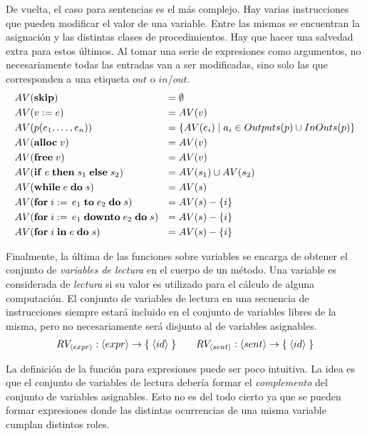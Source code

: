 \documentclass{article}
\begin{document}

De vuelta, el caso para sentencias es el más complejo.
Hay varias instrucciones que pueden modificar el valor de una variable.
Entre las mismas se encuentran la asignación y las distintas clases de procedimientos.
Hay que hacer una salvedad extra para estos últimos.
Al tomar una serie de expresiones como argumentos, no necesariamente todas las entradas van a ser modificadas, sino solo las que corresponden a una etiqueta $out$ o $in/out$.
\begin{align*}
&AV(\mathbf{skip})
&=&\;
\emptyset
\\
&AV(v := e)
&=&\;
AV(v)
\\
&AV(p(e_1, \ldots, e_n))
&=&\;
\{ AV(e_i) \mid a_i \in Outputs(p) \cup InOuts(p) \}
\\
&AV(\mathbf{alloc} \; v)
&=&\;
AV(v)
\\
&AV(\mathbf{free} \; v)
&=&\;
AV(v)
\\
&AV(\mathbf{if} \; e \; \mathbf{then} \; s_1 \; \mathbf{else} \; s_2)
&=&\;
AV(s_1) \cup AV(s_2)
\\
&AV(\mathbf{while} \; e \; \mathbf{do} \; s)
&=&\;
AV(s)
\\
&AV(\mathbf{for} \; i := \, e_1 \; \mathbf{to} \; e_2 \; \mathbf{do} \; s)
&=&\;
AV(s) - \{ i \}
\\
&AV(\mathbf{for} \; i := \, e_1 \; \mathbf{downto} \; e_2 \; \mathbf{do} \; s)
&=&\;
AV(s) - \{ i \}
\\
&AV(\mathbf{for} \; i \; \mathbf{in} \; e \; \mathbf{do} \; s)
&=&\;
AV(s) - \{ i \}
\end{align*}

Finalmente, la última de las funciones sobre variables se encarga de obtener el conjunto de \textit{variables de lectura} en el cuerpo de un método.
Una variable es considerada de \textit{lectura} si su valor es utilizado para el cálculo de alguna computación.
El conjunto de variables de lectura en una secuencia de instrucciones siempre estará incluido en el conjunto de variables libres de la misma, pero no necesariamente será disjunto al de variables asignables.
\begin{gather*}
RV_{\langle expr \rangle}: \langle expr \rangle \rightarrow \{ \; \langle id \rangle \; \}
\qquad
RV_{\langle sent \rangle}: \langle sent \rangle \rightarrow \{ \; \langle id \rangle \; \}
\end{gather*}

La definición de la función para expresiones puede ser poco intuitiva.
La idea es que el conjunto de variables de lectura debería formar el \textit{complemento} del conjunto de variables asignables.
Esto no es del todo cierto ya que se pueden formar expresiones donde las distintas ocurrencias de una misma variable cumplan distintos roles.
\end{document}
